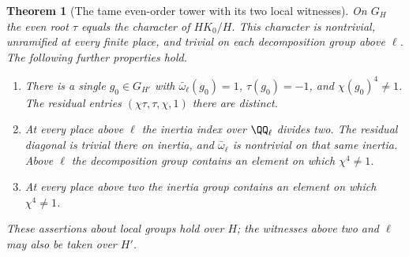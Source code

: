 \documentclass[a4paper,11pt]{article}
\newtheorem{theorem}[proposition]{Theorem}
\theoremstyle{definition}
\theoremstyle{remark}
\numberwithin{equation}{section}
\begin{document}
\begin{theorem}[The tame even-order tower with its two local witnesses]
\leavevmode\label{thm:eventower572}
On \(G_H\) the even root \(\tau\) equals the character of
\(HK_0/H\). This character is nontrivial, unramified at every
finite place, and trivial on each decomposition group above
\(\ell\). The following further properties hold.
\begin{enumerate}
\item There is a single \(g_0\in G_{H'}\) with
\(\bar\omega_\ell(g_0)=1\), \(\tau(g_0)=-1\), and
\(\chi(g_0)^4\ne1\). The residual entries
\((\chi\tau,\tau,\chi,1)\) there are distinct.
\item At every place above \(\ell\) the inertia index
over \(\QQ_\ell\) divides two. The residual diagonal is
trivial there on inertia, and \(\bar\omega_\ell\) is
nontrivial on that same inertia. Above \(\ell\) the
decomposition group contains an element on which
\(\chi^4\ne1\).
\item At every place above two the inertia group contains
an element on which \(\chi^4\ne1\).
\end{enumerate}
These assertions about local groups hold over \(H\); the
witnesses above two and \(\ell\) may also be taken over \(H'\).
\end{theorem}
\end{document}
